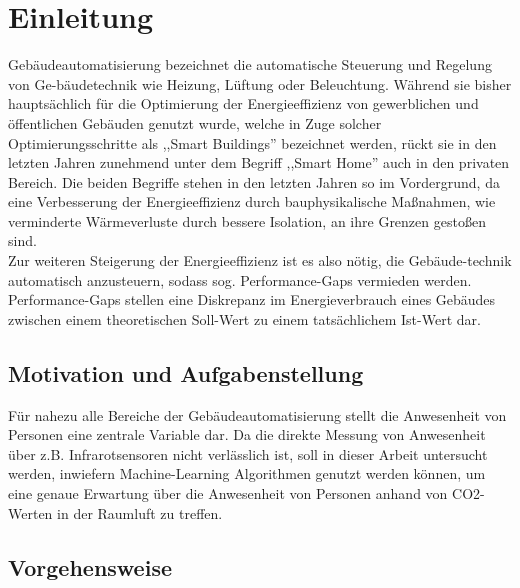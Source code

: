 \clearpage
\chapter{\textbf{Einleitung}}\label{einleitung}



Gebäudeautomatisierung bezeichnet die automatische Steuerung und Regelung von Ge-bäudetechnik 
wie Heizung, Lüftung oder Beleuchtung. Während sie bisher hauptsächlich für die Optimierung 
der Energieeffizienz von gewerblichen und öffentlichen Gebäuden genutzt wurde, welche in 
Zuge solcher Optimierungsschritte als ,,Smart Buildings'' bezeichnet werden, 
rückt sie in den letzten Jahren zunehmend unter dem Begriff ,,Smart Home'' auch in den privaten 
Bereich. Die beiden Begriffe stehen in den letzten Jahren so im Vordergrund, da eine
Verbesserung der Energieeffizienz durch bauphysikalische Maßnahmen, wie verminderte 
Wärmeverluste durch bessere Isolation, an ihre Grenzen gestoßen sind.
\\
Zur weiteren Steigerung der Energieeffizienz ist es also nötig, die Gebäude-technik
automatisch anzusteuern, sodass sog. Performance-Gaps vermieden werden. Performance-Gaps
stellen eine Diskrepanz im Energieverbrauch eines Gebäudes zwischen einem theoretischen 
Soll-Wert zu einem tatsächlichem Ist-Wert dar.


\section{Motivation und Aufgabenstellung}

Für nahezu alle Bereiche der Gebäudeautomatisierung stellt die Anwesenheit 
von Personen eine zentrale Variable dar. Da die direkte Messung von Anwesenheit über z.B. 
Infrarotsensoren nicht verlässlich ist, soll in dieser Arbeit untersucht werden, inwiefern 
Machine-Learning Algorithmen genutzt werden können, um eine genaue Erwartung über 
die Anwesenheit von Personen anhand von CO2-Werten in der Raumluft zu treffen.




\newpage

\section{Vorgehensweise}

